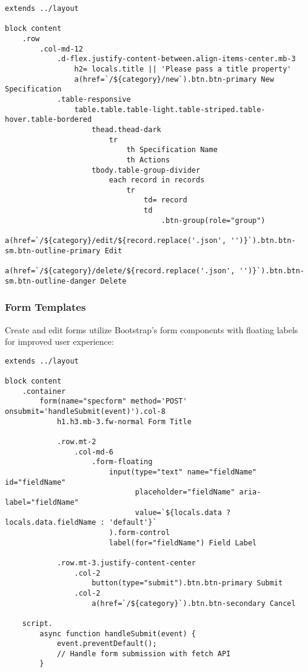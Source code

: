 \documentclass[11pt,a4paper]{article}
\begin{document}
\begin{lstlisting}[language=Pug, caption=List Template Pattern]
extends ../layout

block content
    .row 
        .col-md-12
            .d-flex.justify-content-between.align-items-center.mb-3
                h2= locals.title || 'Please pass a title property'
                a(href=`/${category}/new`).btn.btn-primary New Specification
            .table-responsive
                table.table.table-light.table-striped.table-hover.table-bordered
                    thead.thead-dark 
                        tr
                            th Specification Name
                            th Actions
                    tbody.table-group-divider
                        each record in records
                            tr 
                                td= record
                                td
                                    .btn-group(role="group")
                                        a(href=`/${category}/edit/${record.replace('.json', '')}`).btn.btn-sm.btn-outline-primary Edit
                                        a(href=`/${category}/delete/${record.replace('.json', '')}`).btn.btn-sm.btn-outline-danger Delete
\end{lstlisting}

\subsubsection{Form Templates}
Create and edit forms utilize Bootstrap's form components with floating labels for improved user experience:

\begin{lstlisting}[language=Pug, caption=Form Template Pattern]
extends ../layout

block content
    .container 
        form(name="specform" method='POST' onsubmit='handleSubmit(event)').col-8
            h1.h3.mb-3.fw-normal Form Title
            
            .row.mt-2
                .col-md-6
                    .form-floating
                        input(type="text" name="fieldName" id="fieldName" 
                              placeholder="fieldName" aria-label="fieldName" 
                              value=`${locals.data ? locals.data.fieldName : 'default'}` 
                        ).form-control 
                        label(for="fieldName") Field Label
            
            .row.mt-3.justify-content-center
                .col-2
                    button(type="submit").btn.btn-primary Submit
                .col-2
                    a(href=`/${category}`).btn.btn-secondary Cancel

    script.
        async function handleSubmit(event) {
            event.preventDefault();
            // Handle form submission with fetch API
        }
\end{lstlisting}
\end{document}
